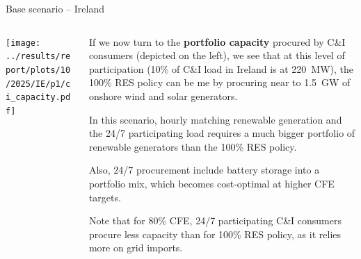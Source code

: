 \begin{frame}{Base scenario -- Ireland}

  {\footnotesize
  \vspace{0.3cm}
  
  \begin{columns}[T]
  \begin{column}{9cm}
  \centering
  
  \texttt{[image: ../results/report/plots/10/2025/IE/p1/ci\_capacity.pdf]}
  \end{column}
  \begin{column}{6cm}
  
  \vspace{0.1cm}
  If we now turn to the {\bf portfolio capacity} procured by 
  C\&I consumers (depicted on the left), we see that at this level of participation
  (10\% of C\&I load in Ireland is at 220~MW), the 100\% RES policy can be 
  me by procuring near to 1.5~GW of onshore wind and solar generators.
  
  \vspace{0.3cm}
  In this scenario, hourly matching renewable generation and the 24/7 participating load
  requires a \alert{much bigger portfolio} of renewable generators than the 
  100\% RES policy. 

  \vspace{0.3cm}
  Also, 24/7 procurement include \alert{battery storage} into a portfolio mix, 
  which becomes cost-optimal \alert{at higher CFE targets}.
  
  \vspace{0.3cm}
  Note that for 80\% CFE, 24/7 participating C\&I consumers procure less 
  capacity than for 100\% RES policy, as it relies more on grid imports.

  \end{column}
  \end{columns}
  }
  \end{frame}



